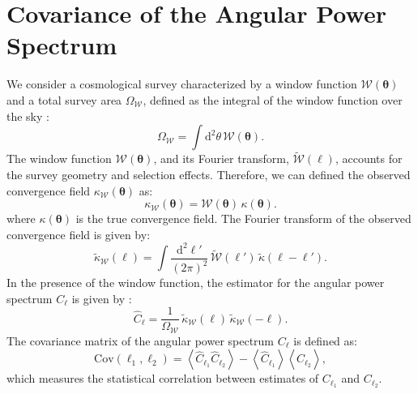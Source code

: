 \section{Covariance of the Angular Power Spectrum}
We consider a cosmological survey characterized by a window function \( \mathcal{W}(\boldsymbol{\theta}) \) and a total survey area \( \Omega_{\mathcal{W}} \), defined as the integral of the window function over the sky \citep{PhysRevD.87.123504}:
\begin{equation}
    \Omega_{\mathcal{W}} = \int \mathrm{d}^2 \theta \, \mathcal{W}(\boldsymbol{\theta}).
\end{equation}
The window function \( \mathcal{W}(\boldsymbol{\theta}) \), and its Fourier transform, \( \tilde{\mathcal{W}}(\boldsymbol{\ell}) \), accounts for the survey geometry and selection effects. 
Therefore, we can defined the observed convergence field \( \kappa_{\mathcal{W}}(\boldsymbol{\theta}) \) as:
\begin{equation}
    \kappa_{\mathcal{W}}(\boldsymbol{\theta}) = \mathcal{W}(\boldsymbol{\theta}) \, \kappa(\boldsymbol{\theta}).
\end{equation}
where \( \kappa(\boldsymbol{\theta}) \) is the true convergence field.
The Fourier transform of the observed convergence field is given by:
\begin{equation}
    \tilde{\kappa}_{\mathcal{W}}(\boldsymbol{\ell}) = \int \frac{\mathrm{d}^2 \ell'}{(2\pi)^2} \, \tilde{\mathcal{W}}(\boldsymbol{\ell}') \, \tilde{\kappa}(\boldsymbol{\ell} - \boldsymbol{\ell}').
\end{equation}
In the presence of the window function, the estimator for the angular power spectrum \( C_\ell \) is given by \citep{PhysRevD.87.123504}:
\begin{equation}
    \hat{C}_\ell = \frac{1}{\Omega_{\mathcal{W}}} \, \tilde{\kappa}_{\mathcal{W}}(\boldsymbol{\ell}) \, \tilde{\kappa}_{\mathcal{W}}(-\boldsymbol{\ell}).
\end{equation}
The covariance matrix of the angular power spectrum \( C_\ell \) is defined as:
\begin{equation}
    \mathrm{Cov}(\ell_1, \ell_2) = \left\langle \hat{C}_{\ell_1} \hat{C}_{\ell_2} \right\rangle - \left\langle \hat{C}_{\ell_1} \right\rangle \left\langle \hat{C}_{\ell_2} \right\rangle,
\end{equation}
which measures the statistical correlation between estimates of \( C_{\ell_1} \) and \( C_{\ell_2} \).

